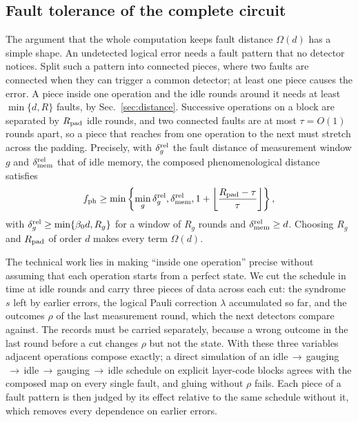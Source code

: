 \documentclass[10pt,a4paper,twocolumn]{article}
\begin{document}
\subsection{Fault tolerance of the complete circuit}
\label{sec:ft}
The argument that the whole computation keeps fault distance $\Omega(d)$ has a
simple shape.  An undetected logical error needs a fault pattern that no
detector notices.  Split such a pattern into connected pieces, where two faults
are connected when they can trigger a common detector; at least one piece causes
the error.  A piece inside one operation and the idle rounds around it needs at
least $\min\{d,R\}$ faults, by Sec.~\ref{sec:distance}.  Successive operations
on a block are separated by $R_{\rm pad}$ idle rounds, and two connected faults
are at most $\tau=O(1)$ rounds apart, so a piece that reaches from one operation
to the next must stretch across the padding.  Precisely, with
$\delta_g^{\rm rel}$ the fault distance of measurement window $g$ and
$\delta_{\rm mem}^{\rm rel}$ that of idle memory, the composed phenomenological
distance satisfies
\begin{equation}
 f_{\rm ph}\ge\min\left\{
 \min_g\delta_g^{\rm rel},\delta_{\rm mem}^{\rm rel},
 1+\left\lfloor\frac{R_{\rm pad}-\tau}{\tau}\right\rfloor
 \right\},
 \label{eq:composition}
\end{equation}
with $\delta_g^{\rm rel}\ge\min\{\beta_0d,R_g\}$ for a window of $R_g$ rounds and
$\delta_{\rm mem}^{\rm rel}\ge d$.  Choosing $R_g$ and $R_{\rm pad}$ of order $d$
makes every term $\Omega(d)$.

The technical work lies in making ``inside one operation'' precise without
assuming that each operation starts from a perfect state.  We cut the schedule
in time at idle rounds and carry three pieces of data across each cut: the
syndrome $s$ left by earlier errors, the logical Pauli correction $\lambda$
accumulated so far, and the outcomes $\rho$ of the last measurement round, which
the next detectors compare against.  The records must be carried separately,
because a wrong outcome in the last round before a cut changes $\rho$ but not the
state.  With these three variables adjacent operations compose exactly; a direct
simulation of an idle$\,\to\,$gauging$\,\to\,$idle$\,\to\,$gauging$\,\to\,$idle
schedule on explicit layer-code blocks agrees with the composed map on every
single fault, and gluing without $\rho$ fails.  Each piece of a fault pattern is
then judged by its effect relative to the same schedule without it, which
removes every dependence on earlier errors.
\end{document}
